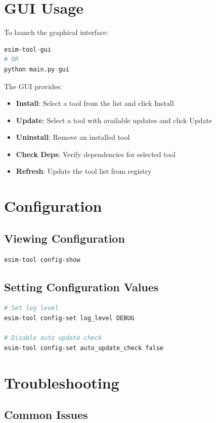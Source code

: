 \documentclass[12pt,a4paper]{report}
\begin{document}
\section{GUI Usage}
To launch the graphical interface:
\begin{lstlisting}[language=bash]
esim-tool-gui
# OR
python main.py gui
\end{lstlisting}

The GUI provides:
\begin{itemize}
    \item \textbf{Install}: Select a tool from the list and click Install
    \item \textbf{Update}: Select a tool with available updates and click Update
    \item \textbf{Uninstall}: Remove an installed tool
    \item \textbf{Check Deps}: Verify dependencies for selected tool
    \item \textbf{Refresh}: Update the tool list from registry
\end{itemize}

\section{Configuration}
\subsection{Viewing Configuration}
\begin{lstlisting}[language=bash]
esim-tool config-show
\end{lstlisting}

\subsection{Setting Configuration Values}
\begin{lstlisting}[language=bash]
# Set log level
esim-tool config-set log_level DEBUG

# Disable auto update check
esim-tool config-set auto_update_check false
\end{lstlisting}

\section{Troubleshooting}
\subsection{Common Issues}
\end{document}
